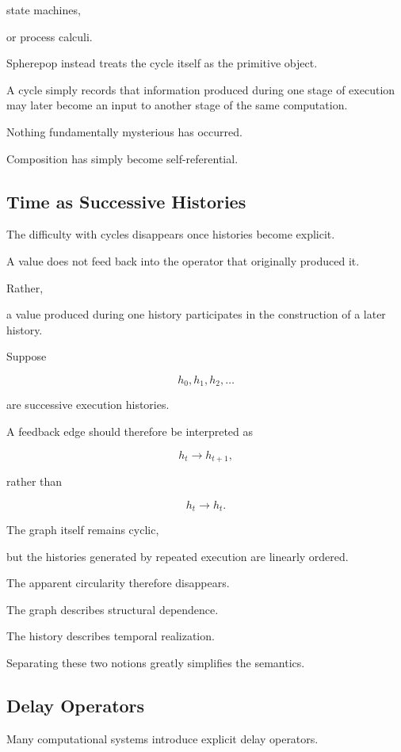 \documentclass[12pt,oneside]{article}
\begin{document}
state machines,

or process calculi.

Spherepop instead treats the cycle itself as the primitive object.

A cycle simply records that information produced during one stage of execution may later become an input to another stage of the same computation.

Nothing fundamentally mysterious has occurred.

Composition has simply become self-referential.

\subsection{Time as Successive Histories}

The difficulty with cycles disappears once histories become explicit.

A value does not feed back into the operator that originally produced it.

Rather,

a value produced during one history participates in the construction of a later history.

Suppose

\[
h_0,
h_1,
h_2,
\ldots
\]

are successive execution histories.

A feedback edge should therefore be interpreted as

\[
h_t
\longrightarrow
h_{t+1},
\]

rather than

\[
h_t
\longrightarrow
h_t.
\]

The graph itself remains cyclic,

but the histories generated by repeated execution are linearly ordered.

The apparent circularity therefore disappears.

The graph describes structural dependence.

The history describes temporal realization.

Separating these two notions greatly simplifies the semantics.

\subsection{Delay Operators}

Many computational systems introduce explicit delay operators.
\end{document}
